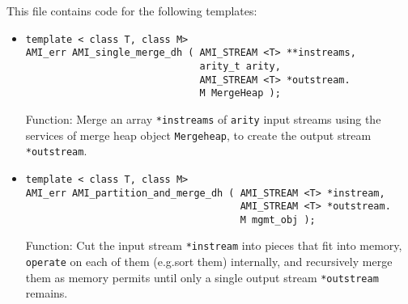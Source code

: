 This file contains code for the following templates:
\begin{itemize}
    
    \item
\begin{lstlisting}
template < class T, class M>
AMI_err AMI_single_merge_dh ( AMI_STREAM <T> **instreams,
                              arity_t arity,
                              AMI_STREAM <T> *outstream.
                              M MergeHeap );
\end{lstlisting}
    Function: Merge an array \lstinline|*instreams| of \lstinline|arity| input
    streams using the services of merge heap object
    \lstinline|Mergeheap|, to create the output stream
    \lstinline|*outstream|.
    
    \item
\begin{lstlisting}
template < class T, class M>
AMI_err AMI_partition_and_merge_dh ( AMI_STREAM <T> *instream,
                                     AMI_STREAM <T> *outstream.
                                     M mgmt_obj );
\end{lstlisting}
    Function: Cut the input stream \lstinline|*instream| into pieces that
    fit into memory, \lstinline|operate| on each of them (e.g.sort
    them) internally, and recursively merge them as memory
    permits until only a single output stream
    \lstinline|*outstream| remains.
\end{itemize}

